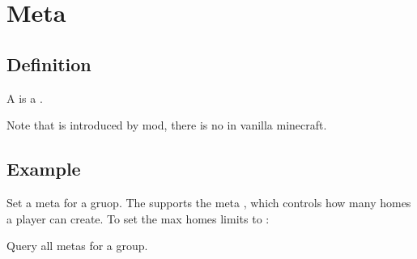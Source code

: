 \chapter{Meta}\label{ch:meta}
\section{Definition}
A  is a .

\begin{note}{}
    Note that  is introduced by  mod, there is no  in vanilla minecraft.
\end{note}


\section{Example}{}
\begin{example}{Set a meta for a gruop.}
    The  supports the meta , which controls how many homes a player can create.
    To set the max homes limits to : 
\end{example}

\begin{example}{Query all metas for a group.}
\end{example}